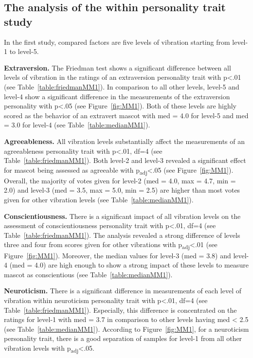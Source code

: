 \subsection{The analysis of the within personality trait study}
\label{subsec:MMstudy1}
In the first study, compared factors are five levels of vibration starting from level-1 to level-5.

\par\textbf{Extraversion.}
The Friedman test shows a significant difference between all levels of vibration in the
ratings of an extraversion personality trait with p<.01 (see Table~\ref{table:friedmanMM1}).
In comparison to all other levels, level-5 and level-4 show a significant difference
in the measurements of the extraversion personality with p<.05 (see Figure~\ref{fig:MM1}).
Both of these levels are highly scored as the behavior of an extravert mascot
with med = 4.0 for level-5 and med = 3.0 for level-4 (see Table~\ref{table:medianMM1}).

\par\textbf{Agreeableness.}
All vibration levels substantially affect the measurements of an agreeableness personality
trait with p<.01, df=4 (see Table~\ref{table:friedmanMM1}).
Both level-2 and level-3 revealed a significant effect for mascot being
assessed as agreeable with p\textsubscript{adj}<.05 (see Figure~\ref{fig:MM1}).
Overall, the majority of votes given for level-2 (med = 4.0, max = 4.7, min = 2.0) and level-3
(med = 3.5, max = 5.0, min = 2.5) are higher than most
votes given for other vibration levels (see Table~\ref{table:medianMM1}).

\par\textbf{Conscientiousness.}
There is a significant impact of all vibration levels on the assessment of conscientiousness
personality trait with p<.01, df=4 (see Table~\ref{table:friedmanMM1}).
The analysis revealed a strong difference of levels three and four
from scores given for other vibrations with p\textsubscript{adj}<.01 (see Figure~\ref{fig:MM1}).
Moreover, the median values for level-3 (med = 3.8) and level-4 (med = 4.0) are high enough
to show a strong impact of these levels to measure mascot as conscientious (see Table~\ref{table:medianMM1}).

\par\textbf{Neuroticism.}
There is a significant difference in measurements of each level of vibration within neuroticism
personality trait with p<.01, df=4 (see Table~\ref{table:friedmanMM1}).
Especially, this difference is concentrated on the ratings for level-1 with med = 3.7
in comparison to other levels having med < 2.5 (see Table~\ref{table:medianMM1}).
According to Figure~\ref{fig:MM1}, for a neuroticism personality trait, there is a good separation of samples for level-1
from all other vibration levels with p\textsubscript{adj}<.05.

